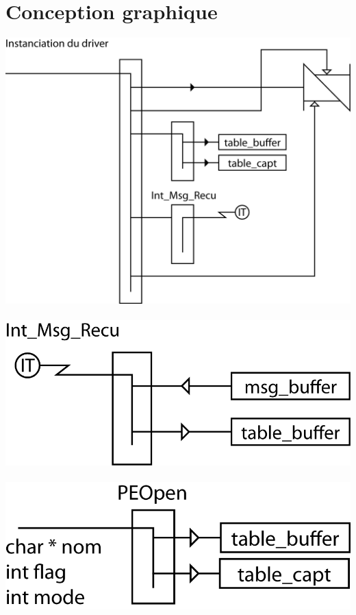 \documentclass[11pt, a4paper]{article}
\begin{document}
\section{Conception graphique}

\includegraphics{ressources/init.png}\\~\\
\includegraphics{ressources/int.png}\\~\\
\includegraphics{ressources/open.png}\\~\\
\end{document}
